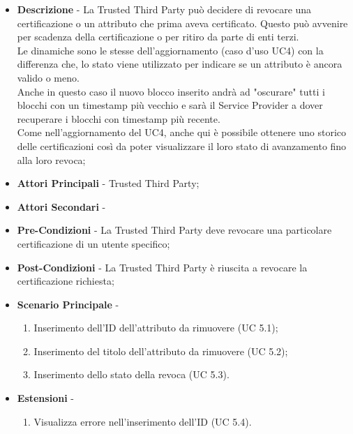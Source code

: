 \begin{itemize}
	\item \textbf{Descrizione} - La Trusted Third Party può decidere di revocare una certificazione o un attributo che prima aveva certificato. Questo può avvenire per scadenza della certificazione o per ritiro da parte di enti terzi.\\
	Le dinamiche sono le stesse dell'aggiornamento (caso d'uso UC4) con la differenza che, lo stato viene utilizzato per indicare se un attributo è ancora valido o meno.\\
	Anche in questo caso il nuovo blocco inserito andrà ad "oscurare" tutti i blocchi con un timestamp più vecchio e sarà il Service Provider a dover recuperare i blocchi con timestamp più recente.\\
	Come nell'aggiornamento del UC4, anche qui è possibile ottenere uno storico delle certificazioni così da poter visualizzare il loro stato di avanzamento fino alla loro revoca;
	\item \textbf{Attori Principali} - Trusted Third Party;
	\item \textbf{Attori Secondari} -
	\item \textbf{Pre-Condizioni} - La Trusted Third Party deve revocare una particolare certificazione di un utente specifico;
	\item \textbf{Post-Condizioni} - La Trusted Third Party è riuscita a revocare la certificazione richiesta;
	\item \textbf{Scenario Principale} -
	\begin{enumerate}
		\item Inserimento dell'ID dell'attributo da rimuovere (UC 5.1);
		\item Inserimento del titolo dell'attributo da rimuovere (UC 5.2);
		\item Inserimento dello stato della revoca (UC 5.3).
	\end{enumerate}
	\item \textbf{Estensioni} -
	\begin{enumerate}
		\item Visualizza errore nell'inserimento dell'ID (UC 5.4).
	\end{enumerate}
\end{itemize}
